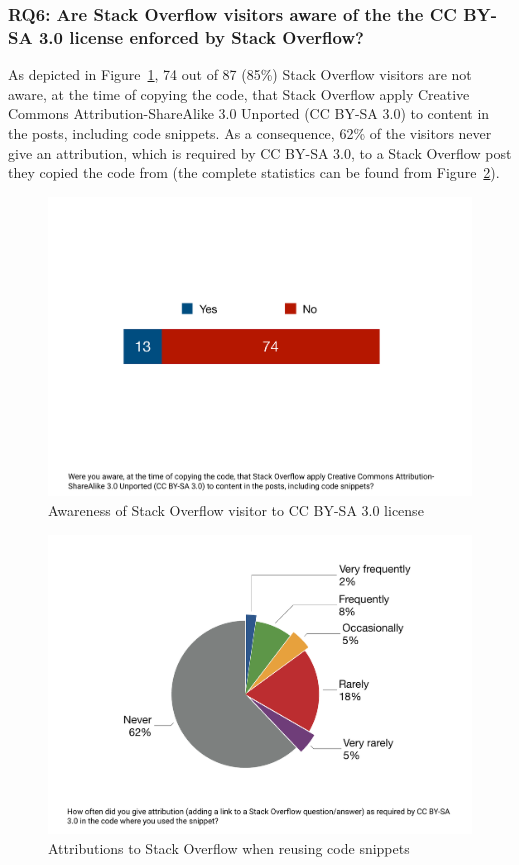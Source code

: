 \documentclass{svjour3}                     %
\begin{document}
\subsubsection*{RQ6: Are Stack Overflow visitors aware of the the CC BY-SA 3.0 license enforced by Stack Overflow?}

As depicted in Figure~\ref{fig:survey_visitor_cc_by-sa}, 74 out of 87 (85\%)
Stack Overflow visitors are not aware, at the time of copying the code, that
Stack Overflow apply Creative Commons Attribution-ShareAlike 3.0 Unported (CC
BY-SA 3.0) to content in the posts, including code snippets. As a consequence,
62\% of the visitors never give an attribution, which is required by CC BY-SA
3.0, to a Stack Overflow post they copied the code from (the complete statistics
can be found from Figure~\ref{fig:survey_visitor_attribution-sa}).

\begin{figure} \centering
	\includegraphics[width=.4\linewidth]{survey_visitor_cc_by_sa} 
	\caption{Awareness of Stack Overflow visitor to CC BY-SA 3.0 license}
	\label{fig:survey_visitor_cc_by-sa} 
\end{figure}

\begin{figure} \centering
	\includegraphics[width=.4\linewidth]{survey_visitor_attribution} 
	\caption{Attributions to Stack Overflow when reusing code snippets}
	\label{fig:survey_visitor_attribution-sa} 
\end{figure}

\vspace{0.5cm} \noindent{} \vspace{0.5cm}
\end{document}
